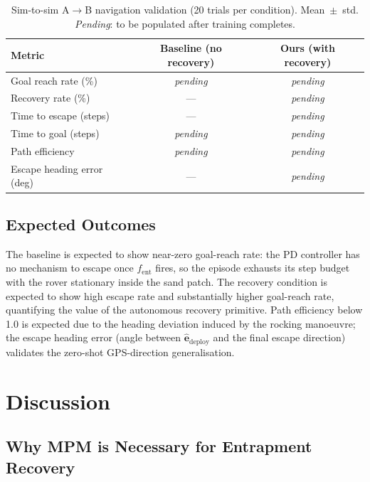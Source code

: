 \documentclass[conference]{IEEEtran}
\begin{document}
\begin{table}[t]
  \centering
  \caption{Sim-to-sim A$\to$B navigation validation (20 trials per condition).
    Mean~$\pm$~std. \emph{Pending}: to be populated after training completes.}
  \label{tab:sim2sim}
  \renewcommand{\arraystretch}{1.2}
  \begin{tabular}{@{}lcc@{}}
    \toprule
    \textbf{Metric} & \textbf{Baseline (no recovery)}
                    & \textbf{Ours (with recovery)} \\
    \midrule
    Goal reach rate (\%)       & \textit{pending} & \textit{pending} \\
    Recovery rate (\%)         & ---              
    & \textit{pending} \\
    Time to escape (steps)     & ---              & \textit{pending} \\
    Time to goal (steps)       & \textit{pending} & \textit{pending} \\
    Path efficiency            & \textit{pending} & \textit{pending} \\
    Escape heading error (deg) & ---              & \textit{pending} \\
    \bottomrule
 
  \end{tabular}
\end{table}

\subsection{Expected Outcomes}

The baseline is expected to show near-zero goal-reach rate: the PD controller
has no mechanism to escape once $f_\text{ent}$ fires, so the episode exhausts
its step budget with the rover stationary inside the sand patch. The recovery
condition is expected to show high escape rate and substantially higher goal-reach
rate, quantifying the value of the autonomous recovery primitive. Path efficiency
below 1.0 is expected due to the heading deviation induced by the rocking manoeuvre;
the escape heading error (angle between $\hat{\mathbf{e}}_\text{deploy}$ and the
final escape direction) validates the zero-shot GPS-direction generalisation. %
\section{Discussion}
\label{sec:discussion}

\subsection{Why MPM is Necessary for Entrapment Recovery}
\end{document}
